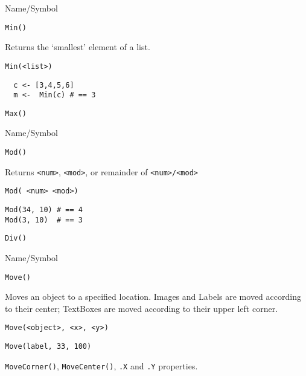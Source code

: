 \rl


\begin{desc}{Name/Symbol}
\item[Name/Symbol]	\verb+Min()+

\item[Description]	Returns the `smallest' element of a list.

\item[Usage]	
\begin{verbatim}
Min(<list>)
\end{verbatim}

\item[Example]	
\begin{verbatim}
  c <- [3,4,5,6]
  m <-  Min(c) # == 3
\end{verbatim}

\item[See Also]	\verb+Max()+
\end{desc}

\rl


\begin{desc}{Name/Symbol}
\item[Name/Symbol]	\verb+Mod()+

\item[Description]	Returns \verb+<num>+, \verb+<mod>+, or remainder of \verb+<num>/<mod>+

\item[Usage]		
\begin{verbatim}
Mod( <num> <mod>)
\end{verbatim}

\item[Example]	
\begin{verbatim}
Mod(34, 10)	# == 4
Mod(3, 10)	# == 3
\end{verbatim}

\item[See Also]	\verb+Div()+
\end{desc}

\rl


\begin{desc}{Name/Symbol}
\item[Name/Symbol]	\verb+Move()+

\item[Description]	Moves an object to a specified location.  
		Images and Labels are moved according to their center; 
		TextBoxes are moved according to their upper left corner.

\item[Usage]
\begin{verbatim}
Move(<object>, <x>, <y>)
\end{verbatim}

\item[Example]	
\begin{verbatim}
Move(label, 33, 100)
\end{verbatim}

\item[See Also]	\verb+MoveCorner()+, \verb+MoveCenter()+, \verb+.X+ and \verb+.Y+ properties.
\end{desc}

